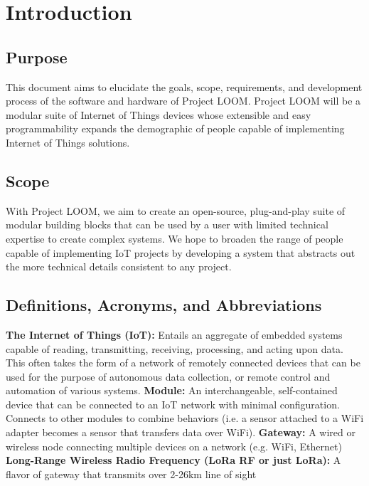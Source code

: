 \documentclass[onecolumn, draftclsnofoot,10pt, compsoc]{IEEEtran}
\begin{document}
\newpage
{}
\tableofcontents
\clearpage

\section{Introduction}
	\subsection{Purpose}
	This document aims to elucidate the goals, scope, requirements, and development process of the software and hardware of Project LOOM. Project LOOM will be a modular suite of Internet of Things devices whose extensible and easy programmability expands the demographic of people capable of implementing Internet of Things solutions.
	\subsection{Scope}
	With Project LOOM, we aim to create an open-source, plug-and-play suite of modular building blocks that can be used by a user with limited technical expertise to create complex systems. We hope to broaden the range of people capable of implementing IoT projects by developing a system that abstracts out the more technical details consistent to any project.
	\subsection{Definitions, Acronyms, and Abbreviations}
	\textbf{The Internet of Things (IoT):} Entails an aggregate of embedded systems capable of reading, transmitting, receiving, processing, and acting upon data. This often takes the form of a network of remotely connected devices that can be used for the purpose of autonomous data collection, or remote control and automation of various systems. \newline
	\textbf{Module:} An interchangeable, self-contained device that can be connected to an IoT network with minimal configuration. Connects to other modules to combine behaviors (i.e. a sensor attached to a WiFi adapter becomes a sensor that transfers data over WiFi). \newline
	\textbf{Gateway:} A wired or wireless node connecting multiple devices on a network (e.g. WiFi, Ethernet) \newline
	\textbf{Long-Range Wireless Radio Frequency (LoRa RF or just LoRa):} A flavor of gateway that transmits over 2-26km line of sight
\end{document}
